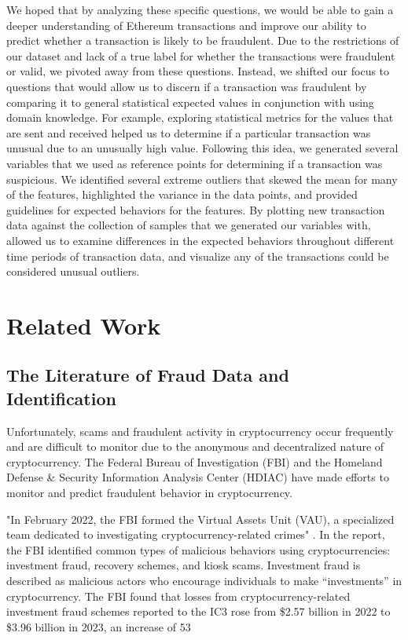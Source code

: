 \documentclass[sigconf]{acmart}
\begin{document}
We hoped that by analyzing these specific questions, we would be able to gain a deeper understanding of Ethereum transactions and improve our ability to predict whether a transaction is likely to be fraudulent. Due to the restrictions of our dataset and lack of a true label for whether the transactions were fraudulent or valid, we pivoted away from these questions. Instead, we shifted our focus to questions that would allow us to discern if a transaction was fraudulent by comparing it to general statistical expected values in conjunction with using domain knowledge.  For example, exploring statistical metrics for the values that are sent and received helped us to determine if a particular transaction was unusual due to an unusually high value. Following this idea, we generated several variables that we used as reference points for determining if a transaction was suspicious. We identified several extreme outliers that skewed the mean for many of the features, highlighted the variance in the data points, and provided guidelines for expected behaviors for the features. By plotting new transaction data against the collection of samples that we generated our variables with, allowed us to examine differences in the expected behaviors throughout different time periods of transaction data, and visualize any of the transactions could be considered unusual outliers. 

\section{Related Work}
\subsection{The Literature of Fraud Data and Identification}
Unfortunately, scams and fraudulent activity in cryptocurrency occur frequently and are difficult to monitor due to the anonymous and decentralized nature of cryptocurrency. The Federal Bureau of Investigation (FBI) and the Homeland Defense \& Security Information Analysis Center (HDIAC) have made efforts to monitor and predict fraudulent behavior in cryptocurrency.

"In February 2022, the FBI formed the Virtual Assets Unit (VAU), a specialized team dedicated to investigating cryptocurrency-related crimes" \cite{FBI2023}. In the report, the FBI identified common types of malicious behaviors using cryptocurrencies: investment fraud, recovery schemes, and kiosk scams. Investment fraud is described as malicious actors who encourage individuals to make “investments” in cryptocurrency. The FBI found that losses from cryptocurrency-related investment fraud schemes reported to the IC3 rose from \$2.57 billion in 2022 to \$3.96 billion in 2023, an increase of 53%
\end{document}

